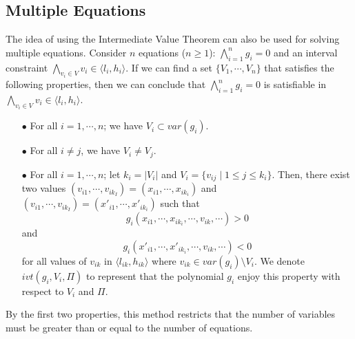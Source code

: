 \documentclass[runningheads,a4paper,oribibl]{llncs}
\begin{document}
\subsection*{Multiple Equations}
The idea of using the Intermediate Value Theorem can also be used for solving multiple equations. Consider $n$ equations ($n \ge 1$): $\bigwedge \limits_{i=1}^n g_i = 0$ and an interval constraint ${\bigwedge\limits_{v_i \in V}v_i \in \langle l_i, h_i \rangle}$. If we can find a set ${\{V_1, \cdots, V_n\}}$ that satisfies the following properties, then we can conclude that $\bigwedge \limits_{i=1}^n g_i = 0$ is satisfiable in ${\bigwedge\limits_{v_i \in V}v_i \in \langle l_i, h_i \rangle}$.
\begin{itemize}
\item[$\bullet$] For all $i = 1, \cdots, n$; we have ${V_i \subset var(g_i)}$.
\item[$\bullet$] For all $i \neq j$, we have $V_i \neq V_j$.
\item[$\bullet$] For all $i = 1, \cdots, n$; let $k_i = |V_i|$ and $V_i = \{v_{ij} \; | \; 1 \le j \le k_i \}$. Then, there exist two values ${(v_{i1}, \cdots, v_{ik_I}) = (x_{i1}, \cdots, x_{ik_i})}$ and ${(v_{i1}, \cdots, v_{ik_I}) = (x'_{i1}, \cdots, x'_{ik_i})}$ such that \[g_i(x_{i1}, \cdots, x_{ik_i}, \cdots, v_{ik}, \cdots) > 0\] and \[g_i(x'_{i1}, \cdots, x'_{ik_i}, \cdots, v_{ik}, \cdots) < 0\] for all values of $v_{ik}$ in $\langle l_{ik}, h_{ik} \rangle$ where $v_{ik} \in var(g_i) \setminus V_i$. We denote $ivt(g_i, V_i, \Pi)$ to represent that the polynomial $g_i$ enjoy this property with respect to $V_i$ and $\Pi$.
\end{itemize}
By the first two properties, this method restricts that the number of variables must be greater than or equal to the number of equations.
\end{document}
